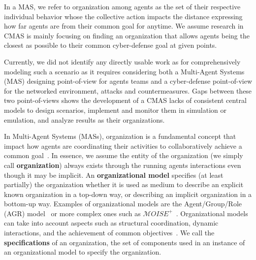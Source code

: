 \documentclass[runningheads]{llncs}
\begin{document}
In a MAS, we refer to organization among agents as the set of their respective individual behavior whose the collective action impacts the distance expressing how far agents are from their common goal for anytime. We assume research in CMAS is mainly focusing on finding an organization that allows agents being the closest as possible to their common cyber-defense goal at given points.


Currently, we did not identify any directly usable work as for comprehensively modeling such a scenario as it requires considering both a Multi-Agent Systems (MAS) designing point-of-view for agents teams and a cyber-defense point-of-view for the networked environment, attacks and countermeasures.
Gaps between these two point-of-views shows the development of a CMAS lacks of consistent central models to design scenarios, implement and monitor them in simulation or emulation, and analyze results as their organizations.

In Multi-Agent Systems (MASs), organization is a fundamental concept that impact how agents are coordinating their activities to collaboratively achieve a common goal~\cite{Hubner2002}. In essence, we assume the entity of the organization (we simply call \textbf{organization}) always exists through the running agents interactions even though it may be implicit.
An \textbf{organizational model} specifies (at least partially) the organization whether it is used as medium to describe an explicit known organization in a top-down way, or describing an implicit organization in a bottom-up way. Examples of organizational models are the Agent/Group/Role (AGR) model~\cite{Ferber2004} or more complex ones such as $\mathcal{M}OISE^{+}$~\cite{Hubner2002}. Organizational models can take into account aspects such as structural coordination, dynamic interactions, and the achievement of common objectives~\cite{Ferber2004, Abbas2015}. We call the \textbf{specifications} of an organization, the set of components used in an instance of an organizational model to specify the organization.
\end{document}
